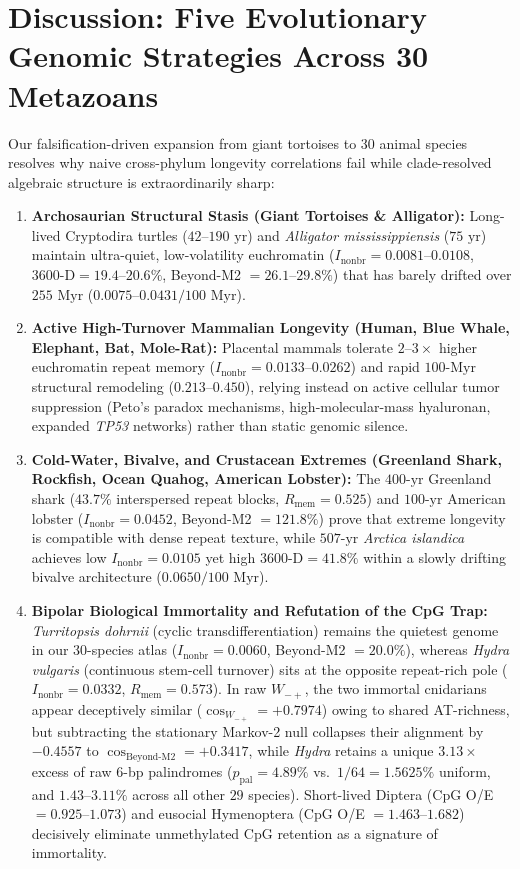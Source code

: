 \documentclass[11pt,a4paper]{article}
\renewcommand{\_}{\origunderscore\penalty200\relax}
\theoremstyle{remark}
\begin{document}
\section{Discussion: Five Evolutionary Genomic Strategies Across 30 Metazoans}
Our falsification-driven expansion from giant tortoises to 30 animal species resolves why naive cross-phylum longevity correlations fail while clade-resolved algebraic structure is extraordinarily sharp:
\begin{enumerate}
  \item \textbf{Archosaurian Structural Stasis (Giant Tortoises \& Alligator):} Long-lived Cryptodira turtles ($42\text{--}190\text{ yr}$) and \textit{Alligator mississippiensis} ($75\text{ yr}$) maintain ultra-quiet, low-volatility euchromatin ($I_{\mathrm{nonbr}} = 0.0081\text{--}0.0108$, $3600\text{-D} = 19.4\text{--}20.6\%$, Beyond-M2 $= 26.1\text{--}29.8\%$) that has barely drifted over $255\text{ Myr}$ ($0.0075\text{--}0.0431 / 100\text{ Myr}$).
  \item \textbf{Active High-Turnover Mammalian Longevity (Human, Blue Whale, Elephant, Bat, Mole-Rat):} Placental mammals tolerate $2\text{--}3\times$ higher euchromatin repeat memory ($I_{\mathrm{nonbr}} = 0.0133\text{--}0.0262$) and rapid $100\text{-Myr}$ structural remodeling ($0.213\text{--}0.450$), relying instead on active cellular tumor suppression (Peto's paradox mechanisms, high-molecular-mass hyaluronan, expanded \textit{TP53} networks) rather than static genomic silence.
  \item \textbf{Cold-Water, Bivalve, and Crustacean Extremes (Greenland Shark, Rockfish, Ocean Quahog, American Lobster):} The $400\text{-yr}$ Greenland shark ($43.7\%$ interspersed repeat blocks, $R_{\mathrm{mem}}=0.525$) and $100\text{-yr}$ American lobster ($I_{\mathrm{nonbr}}=0.0452$, Beyond-M2 $=121.8\%$) prove that extreme longevity is compatible with dense repeat texture, while $507\text{-yr}$ \textit{Arctica islandica} achieves low $I_{\mathrm{nonbr}}=0.0105$ yet high $3600\text{-D}=41.8\%$ within a slowly drifting bivalve architecture ($0.0650 / 100\text{ Myr}$).
  \item \textbf{Bipolar Biological Immortality and Refutation of the CpG Trap:} \textit{Turritopsis dohrnii} (cyclic transdifferentiation) remains the quietest genome in our 30-species atlas ($I_{\mathrm{nonbr}}=0.0060$, Beyond-M2 $=20.0\%$), whereas \textit{Hydra vulgaris} (continuous stem-cell turnover) sits at the opposite repeat-rich pole ($I_{\mathrm{nonbr}}=0.0332$, $R_{\mathrm{mem}}=0.573$). In raw $W_{-+}$, the two immortal cnidarians appear deceptively similar ($\cos_{W_{-+}} = +0.7974$) owing to shared AT-richness, but subtracting the stationary Markov-2 null collapses their alignment by $-0.4557$ to $\cos_{\mathrm{Beyond\text{-}M2}} = +0.3417$, while \textit{Hydra} retains a unique $3.13\times$ excess of raw 6-bp palindromes ($p_{\mathrm{pal}} = 4.89\%$ vs.\ $1/64 = 1.5625\%$ uniform, and $1.43\text{--}3.11\%$ across all other $29$ species). Short-lived Diptera ($\mathrm{CpG}$ O/E $=0.925\text{--}1.073$) and eusocial Hymenoptera ($\mathrm{CpG}$ O/E $=1.463\text{--}1.682$) decisively eliminate unmethylated $\mathrm{CpG}$ retention as a signature of immortality.

\end{enumerate}
\end{document}

